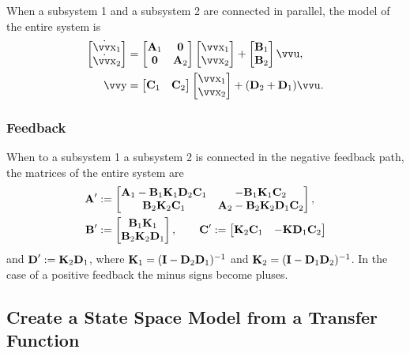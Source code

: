 When a subsystem 1 and a subsystem 2 are connected in parallel, the model of the entire system is
\begin{align*}
	\begin{bmatrix}
		\dot{\vec{x}}_1 \\ \dot{\vec{x}}_2
	\end{bmatrix}
	&=
	\begin{bmatrix}
			\mx{A}_1 & \mx{0} \\
			\mx{0} & \mx{A}_2 
	\end{bmatrix}
	\begin{bmatrix}
		\vec{x}_1 \\ \vec{x}_2
	\end{bmatrix}
	+
	\begin{bmatrix}
		\mx{B}_1 \\ \mx{B}_2
	\end{bmatrix}
	\vec{u},
	\\
	\vec{y}
	&=
	\begin{bmatrix}
		\mx{C}_1 & \mx{C}_2
	\end{bmatrix}
	\begin{bmatrix}
		\vec{x}_1 \\ \vec{x}_2
	\end{bmatrix}
	+
	(\mx{D}_2 + \mx{D}_1) \vec{u}.
\end{align*}

\subsubsection{Feedback}

When to a subsystem 1 a subsystem 2 is connected in the negative feedback path, the matrices of the entire system are
\begin{align*}
	\bm{\mathrm{A}}' &:=
	\begin{bmatrix}
		\bm{\mathrm{A}}_1 - \bm{\mathrm{B}}_1 \bm{\mathrm{K}}_1 \bm{\mathrm{D}}_2 \bm{\mathrm{C}}_1 &
		-\bm{\mathrm{B}}_1 \bm{\mathrm{K}}_1 \bm{\mathrm{C}}_2 \\
		\bm{\mathrm{B}}_2 \bm{\mathrm{K}}_2 \bm{\mathrm{C}}_1 &
		\bm{\mathrm{A}}_2 - \bm{\mathrm{B}}_2 \bm{\mathrm{K}}_2 \bm{\mathrm{D}}_1 \bm{\mathrm{C}}_2
	\end{bmatrix},
	\\
	\bm{\mathrm{B}}' &:= 
	\begin{bmatrix}
		\bm{\mathrm{B}}_1 \bm{\mathrm{K}}_1 \\ \bm{\mathrm{B}}_2 \bm{\mathrm{K}}_2 \bm{\mathrm{D}}_1
	\end{bmatrix},
	\qquad
	\bm{\mathrm{C}}' := 
	\begin{bmatrix}
		\bm{\mathrm{K}}_2 \bm{\mathrm{C}}_1 &
		-\bm{\mathrm{K}} \bm{\mathrm{D}}_1 \bm{\mathrm{C}}_2
	\end{bmatrix}
\end{align*}
and \(\bm{\mathrm{D}}' := \bm{\mathrm{K}}_2 \bm{\mathrm{D}}_1\), where \(\bm{\mathrm{K}}_1 = (\bm{\mathrm{I}} - \bm{\mathrm{D}}_2 \bm{\mathrm{D}}_1)^{-1}\) and  \(\bm{\mathrm{K}}_2 = (\bm{\mathrm{I}} - \bm{\mathrm{D}}_1 \bm{\mathrm{D}}_2)^{-1}\). In the case of a positive feedback the minus signs become pluses.

\subsection{Create a State Space Model from a Transfer Function}

